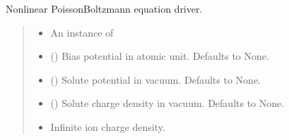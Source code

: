 \documentclass[letterpaper,10pt,english]{sphinxmanual}
\begin{document}
\begin{fulllineitems}
\label{\detokenize{fcdft.solvent:fcdft.solvent.pbe.make_phi}}
\pysigstartsignatures
\pysiglinewithargsret
{}
{\sphinxparamcomma {}\sphinxparamcomma {}\sphinxparamcomma {}}
{}
\pysigstopsignatures
\sphinxAtStartPar
Non\sphinxhyphen{}linear Poisson\sphinxhyphen{}Boltzmann equation driver.
\begin{quote}\begin{description}
\begin{itemize}
\item {} 
\sphinxAtStartPar
{} \textendash{} An instance of {\hyperref[\detokenize{fcdft.solvent:fcdft.solvent.pbe.PBE}]{}}

\item {} 
\sphinxAtStartPar
{} (\sphinxstyleliteralemphasis{\sphinxupquote{, }}) \textendash{} Bias potential in atomic unit. Defaults to None.

\item {} 
\sphinxAtStartPar
{} (\sphinxstyleliteralemphasis{\sphinxupquote{, }}) \textendash{} Solute potential in vacuum. Defaults to None.

\item {} 
\sphinxAtStartPar
{} (\sphinxstyleliteralemphasis{\sphinxupquote{, }}) \textendash{} Solute charge density in vacuum. Defaults to None.

\end{itemize}

\begin{itemize}
\item {} 
\sphinxAtStartPar
{} \textendash{} Infinite ion charge density.


\end{itemize}
\end{description}
\end{quote}
\end{fulllineitems}
\end{document}
